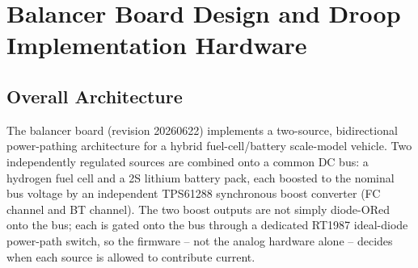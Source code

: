 
\section{Balancer Board Design and Droop Implementation Hardware}
\label{sec:board-design}


\subsection{Overall Architecture}
\label{sec:board-architecture}

The balancer board (revision 20260622) implements a two-source,
bidirectional power-pathing architecture for a hybrid fuel-cell/battery
scale-model vehicle. Two independently regulated sources are combined onto
a common DC bus: a hydrogen fuel cell and a 2S lithium battery pack, each
boosted to the nominal bus voltage by an independent
TPS61288 synchronous boost converter (FC channel and BT channel). The two
boost outputs are not simply diode-ORed onto the bus; each is gated onto
the bus through a dedicated RT1987 ideal-diode power-path switch, so the
firmware -- not the analog hardware alone -- decides when each source is
allowed to contribute current.


